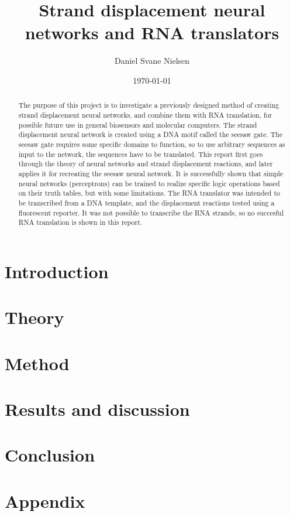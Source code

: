 \documentclass{report}
\title{Strand displacement neural networks and RNA translators}
\author{Daniel Svane Nielsen}
\date{\today}
\begin{document}
  \maketitle

  \begin{abstract}
  The purpose of this project is to investigate a previously designed method of creating strand displacement neural networks, and combine them with RNA translation, for possible future use in general biosensors and molecular computers. The strand displacement neural network is created using a DNA motif called the seesaw gate. The seesaw gate requires some specific domains to function, so to use arbitrary sequences as input to the network, the sequences have to be translated. This report first goes through the theory of neural networks and strand displacement reactions, and later applies it for recreating the seesaw neural network. It is successfully shown that simple neural networks (perceptrons) can be trained to realize specific logic operations based on their truth tables, but with some limitations. The RNA translator was intended to be transcribed from a DNA template, and the displacement reactions tested using a fluorescent reporter. It was not possible to transcribe the RNA strands, so no succesful RNA translation is shown in this report.
  \end{abstract}


  \tableofcontents

  \chapter{Introduction}
  


  \chapter{Theory}
  
  
  \chapter{Method}
  
  \chapter{Results and discussion}
  


  \chapter{Conclusion}
  

  
  

  \appendix
  \chapter{Appendix}
  
\end{document}
